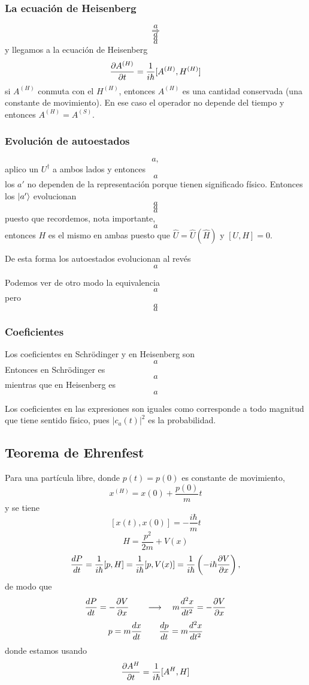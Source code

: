 \documentclass[10pt,oneside]{CBFT_book}
\begin{document}
\subsubsection{La ecuación de Heisenberg}

\[
	a
\]
\[
	\Rightarrow 
\]
\[
	a
\]
\[
	a
\]
\[
	a
\]
y llegamos a la ecuación de Heisenberg
\[
	\dpar{A^{(H)}}{t} = \frac{1}{i\hbar} [ A^{(H)}, H^{(H)}]
\]
si $A^{(H)}$ conmuta con el $H^{(H)}$, entonces $A^{(H)}$ es una cantidad conservada (una constante de movimiento).
En ese caso el operador no depende del tiempo y entonces $A^{(H)} = A^{(S)}$.

\subsubsection{Evolución de autoestados}

\[
	a,
\]
aplico un $U^\dagger$ a ambos lados y entonces 
\[
	a
\]
los $a'$ no dependen de la representación porque tienen significado físico. Entonces los $\Ket{a'}$ evolucionan
\[
	a
\]
\[
	a
\]
\[
	a
\]
puesto que recordemos, nota importante,
\[
	a
\]
entonces $H$ es el mismo en ambas puesto que $\hat{U} =\hat{U}(\hat{H}) $ y $[U,H]=0$.

De esta forma los autoestados evolucionan al revés 
\[
	a
\]

Podemos ver de otro modo la equivalencia
\[
	a
\]
pero 
\[
	a
\]
\[
	a
\]

\subsubsection{Coeficientes}

Los coeficientes en Schrödinger y en Heisenberg son 
\[
	a
\]
Entonces en Schrödinger es 
\[
	a
\]
mientras que en Heisenberg es 
\[
	a
\]

Los coeficientes en las expresiones son iguales como corresponde a todo magnitud que tiene sentido físico, pues 
$|c_a(t)|^2$ es la probabilidad.

\subsection{Teorema de Ehrenfest}

Para una partícula libre, donde $p(t)=p(0)$ es constante de movimiento,
\[
	x^{(H)} = x(0) + \frac{p(0)}{m}t
\]
y se tiene 
\[
	[x(t),x(0)] = -\frac{i\hbar}{m}t
\]
\[
	H = \frac{p^2}{2m} + V(x)
\]
\[
	\dtot{P}{t} = \frac{1}{i\hbar}[p,H] = \frac{1}{i\hbar}[p,V(x)] = 
	\frac{1}{i\hbar}\left( -i\hbar\dpar{V}{x}\right),
\]
de modo que 
\[
	\dtot{P}{t} = -\dpar{V}{x} \qquad \longrightarrow \quad m \dtot[2]{x}{t} = -\dpar{V}{x} 
\]
\[
	p = m \dtot{x}{t} \qquad \dtot{p}{t} = m \dtot[2]{x}{t} 
\]
donde estamos usando 
\[
	\dpar{A^H}{t} = \frac{1}{i\hbar}[A^H,H]
\]
\end{document}

